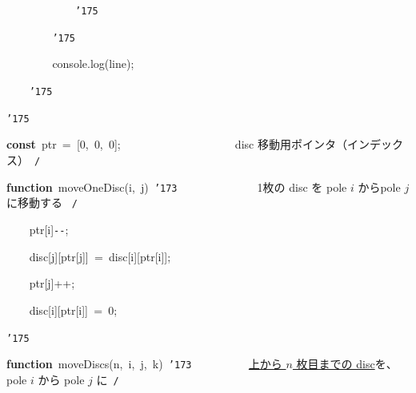 \documentclass[a4paper,10pt]{article}
\def\mc{\relax}
\begin{document}
\noindent
\mbox{}{\tt\mc \ }{\tt\mc \ }{\tt\mc \ }{\tt\mc \ }{\tt\mc \ }{\tt\mc \ }{\tt\mc \ }{\tt\mc \ }{\tt\mc \ }{\tt\mc \ }{\tt\mc \ }{\tt\mc \ }{\tt\char'175}

\noindent
\mbox{}{\tt\mc \ }{\tt\mc \ }{\tt\mc \ }{\tt\mc \ }{\tt\mc \ }{\tt\mc \ }{\tt\mc \ }{\tt\mc \ }{\tt\char'175}

\noindent
\mbox{}{\tt\mc \ }{\tt\mc \ }{\tt\mc \ }{\tt\mc \ }{\tt\mc \ }{\tt\mc \ }{\tt\mc \ }{\tt\mc \ }console.log(line);

\noindent
\mbox{}{\tt\mc \ }{\tt\mc \ }{\tt\mc \ }{\tt\mc \ }{\tt\char'175}

\noindent
\mbox{}{\tt\char'175}

\noindent
\mbox{}\hfill

\noindent
\mbox{}\textbf{const}{\tt\mc \ }ptr{\tt\mc \ }={\tt\mc \ }[0,{\tt\mc \ }0,{\tt\mc \ }0];{\tt\mc \ }{\tt\mc \ }{\tt\mc \ }{\tt\mc \ }{\tt\mc \ }{\tt\mc \ }{\tt\mc \ }{\tt\mc \ }{\tt\mc \ }{\tt\mc \ }{\tt\mc \ }{\tt\mc \ }{\tt\mc \ }{\tt\mc \ }{\tt\mc \ }{\tt\mc \ }{\tt\mc \ }{\tt\mc \ }\rm\mc {\tt /}{\tt *}\  \ disc 移動用ポインタ（インデックス）\hfill \rm\mc \ {\tt *}{\tt /}
\tt\mc 

\noindent
\mbox{}\hfill

\noindent
\mbox{}\textbf{function}{\tt\mc \ }moveOneDisc(i,{\tt\mc \ }j){\tt\mc \ }{\tt\char'173}{\tt\mc \ }{\tt\mc \ }{\tt\mc \ }{\tt\mc \ }{\tt\mc \ }{\tt\mc \ }{\tt\mc \ }{\tt\mc \ }{\tt\mc \ }{\tt\mc \ }{\tt\mc \ }{\tt\mc \ }\rm\mc {\tt /}{\tt *}\  \ 1枚の disc を pole $i$ からpole $j$ に移動する \hfill \rm\mc \ {\tt *}{\tt /}
\tt\mc 

\noindent
\mbox{}{\tt\mc \ }{\tt\mc \ }{\tt\mc \ }{\tt\mc \ }ptr[i]{\tt -}{\tt -};

\noindent
\mbox{}{\tt\mc \ }{\tt\mc \ }{\tt\mc \ }{\tt\mc \ }disc[j][ptr[j]]{\tt\mc \ }={\tt\mc \ }disc[i][ptr[i]];

\noindent
\mbox{}{\tt\mc \ }{\tt\mc \ }{\tt\mc \ }{\tt\mc \ }ptr[j]++;

\noindent
\mbox{}{\tt\mc \ }{\tt\mc \ }{\tt\mc \ }{\tt\mc \ }disc[i][ptr[i]]{\tt\mc \ }={\tt\mc \ }0;

\noindent
\mbox{}{\tt\char'175}

\noindent
\mbox{}\hfill

\noindent
\mbox{}\textbf{function}{\tt\mc \ }moveDiscs(n,{\tt\mc \ }i,{\tt\mc \ }j,{\tt\mc \ }k){\tt\mc \ }{\tt\char'173}{\tt\mc \ }{\tt\mc \ }{\tt\mc \ }{\tt\mc \ }{\tt\mc \ }{\tt\mc \ }{\tt\mc \ }{\tt\mc \ }\rm\mc {\tt /}{\tt *}\  \ \underline{\textsf{上から $n$ 枚目までの disc}}を、pole $i$ から pole $j$ に\hfill \rm\mc \ {\tt *}{\tt /}
\tt\mc 
\end{document}
